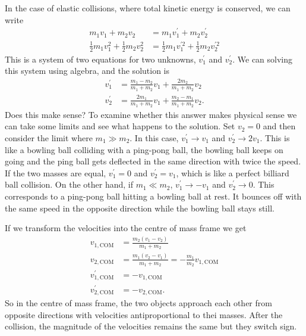 \documentclass[../classical_mechanics.tex]{subfiles}
\begin{document}
        In the case of elastic collisions, where total kinetic energy is conserved, we can write
        \begin{align}
            m_1v_1+m_2v_2&=m_1v_1^\prime+m_2v_2^\prime\\
            \frac{1}{2}m_1v_1^2+\frac{1}{2}m_2v_2^2&=\frac{1}{2}m_1v_1^{\prime 2}+\frac{1}{2}m_2v_2^{\prime 2}
        \end{align}
        This is a system of two equations for two unknowns, $v_1^\prime$ and $v_2^\prime$.
        We can solving this system using algebra, and the solution is
        \begin{align}
            v_1^\prime&=\frac{m_1-m_2}{m_1+m_2}v_1+\frac{2m_2}{m_1+m_2}v_2\\
            v_2^\prime&=\frac{2m_1}{m_1+m_2}v_1+\frac{m_2-m_1}{m_1+m_2}v_2.
        \end{align}
        Does this make sense?
        To examine whether this answer makes physical sense we can take some limits and see what happens to the solution.
        Set $v_2=0$ and then consider the limit where $m_1\gg m_2$.
        In this case, $v_1^\prime\to v_1$ and $v_2^\prime\to 2v_1$.
        This is like a bowling ball colliding with a ping-pong ball, the bowling ball keeps on going and the ping ball gets deflected in the same direction with twice the speed.
        If the two masses are equal, $v_1^\prime=0$ and $v_2^\prime=v_1$, which is like a perfect billiard ball collision.
        On the other hand, if $m_1\ll m_2$, $v_1^\prime\to -v_1$ and $v_2^\prime\to 0$.
        This corresponds to a ping-pong ball hitting a bowling ball at rest. It bounces off with the same speed in the opposite direction while the bowling ball stays still.

        If we transform the velocities into the centre of mass frame we get
        \begin{align}
            v_{1,\text{COM}}&=\frac{m_2(v_1-v_2)}{m_1+m_2}\\
            v_{2,\text{COM}}&=\frac{m_1(v_2-v_1)}{m_1+m_2}=-\frac{m_1}{m_2}v_{1,\text{COM}}\\
            v_{1,\text{COM}}^\prime&=-v_{1,\text{COM}}\\
            v_{2,\text{COM}}^\prime&=-v_{2,\text{COM}}.
        \end{align}
        So in the centre of mass frame, the two objects approach each other from opposite directions with velocities antiproportional to thei masses.
        After the collision, the magnitude of the velocities remains the same but they switch sign.
\end{document}
